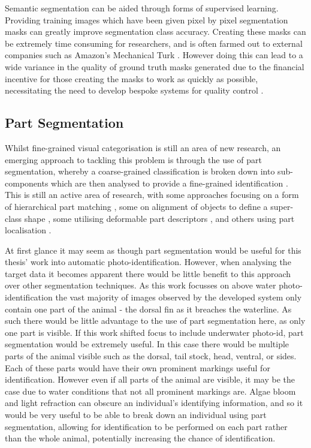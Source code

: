 Semantic segmentation can be aided through forms of supervised learning. Providing training images which have been given pixel by pixel segmentation masks can greatly improve segmentation class accuracy. Creating these masks can be extremely time consuming for researchers, and is often farmed out to external companies such as Amazon's Mechanical Turk \cite{buhrmester_amazons_2011}. However doing this can lead to a wide variance in the quality of ground truth masks generated due to the financial incentive for those creating the masks to work as quickly as possible, necessitating the need to develop bespoke systems for quality control \cite{maji_large_2011}.

\subsection{Part Segmentation}\label{ch:Background,sec:Fine-grainedCV,sub:PartSegmentation}

Whilst fine-grained visual categorisation is still an area of new research, an emerging approach to tackling this problem is through the use of part segmentation, whereby a coarse-grained classification is broken down into sub-components which are then analysed to provide a fine-grained identification \cite{zhang_part-based_2014}. This is still an active area of research, with some approaches focusing on a form of hierarchical part matching \cite{xie_hierarchical_2013}, some on alignment of objects to define a super-class shape \cite{gavves_fine-grained_2013}, some utilising deformable part descriptors \cite{zhang_deformable_2013}, and others using part localisation \cite{liu_dog_2012}.

At first glance it may seem as though part segmentation would be useful for this thesis' work into automatic photo-identification. However, when analysing the target data it becomes apparent there would be little benefit to this approach over other segmentation techniques. As this work focusses on above water photo-identification the vast majority of images observed by the developed system only contain one part of the animal - the dorsal fin as it breaches the waterline.  As such there would be little advantage to the use of part segmentation here, as only one part is visible. If this work shifted focus to include underwater photo-id, part segmentation would be extremely useful. In this case there would be multiple parts of the animal visible such as the dorsal, tail stock, head, ventral, or sides. Each of these parts would have their own prominent markings useful for identification. However even if all parts of the animal are visible, it may be the case due to water conditions that not all prominent markings are. Algae bloom and light refraction can obscure an individual's identifying information, and so it would be very useful to be able to break down an individual using part segmentation, allowing for identification to be performed on each part rather than the whole animal, potentially increasing the chance of identification.  


